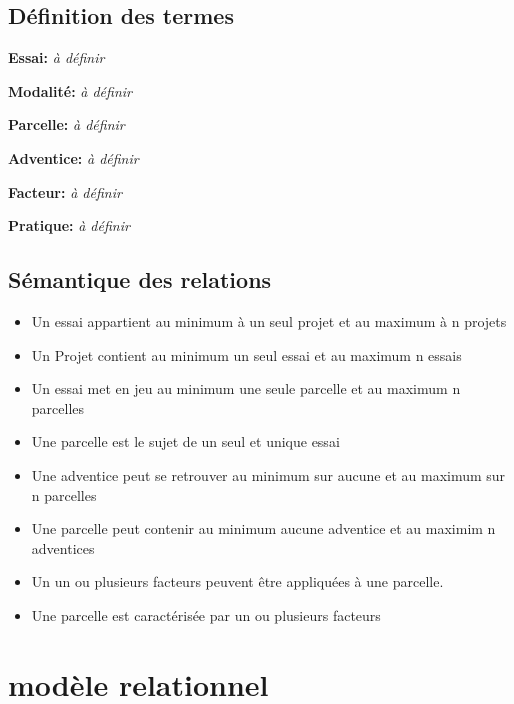 \documentclass{article}
\begin{document}
\subsection{Définition des termes}

\textbf{Essai:} \textit{à définir} 

\textbf{Modalité:} \textit{à définir}

\textbf{Parcelle:} \textit{à définir}

\textbf{Adventice:} \textit{à définir}

\textbf{Facteur:} \textit{à définir}

\textbf{Pratique:} \textit{à définir}


\subsection{Sémantique des relations}
\begin{itemize}
  \item Un essai appartient au minimum à un seul projet et au maximum à n projets 
  \item Un Projet contient au minimum un seul essai et au maximum n essais
  \item Un essai met en jeu au minimum une seule parcelle et au maximum n parcelles
  \item Une parcelle est le sujet de un seul et unique essai
  \item Une adventice peut se retrouver au minimum sur aucune et au maximum sur n parcelles
  \item Une parcelle peut contenir au minimum aucune adventice et au maximim n adventices
  \item Un un ou plusieurs facteurs peuvent être appliquées à une parcelle.
  \item Une parcelle est caractérisée par un ou plusieurs facteurs
\end{itemize}


\section{modèle relationnel}
\end{document}
